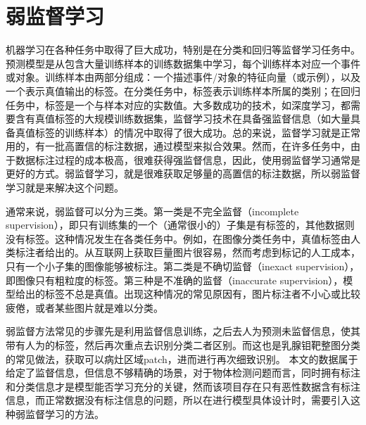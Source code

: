 \section{弱监督学习}
机器学习在各种任务中取得了巨大成功，特别是在分类和回归等监督学习任务中。预测模型是从包含大量训练样本的训练数据集中学习，每个训练样本对应一个事件或对象。训练样本由两部分组成：一个描述事件/对象的特征向量（或示例），以及一个表示真值输出的标签。在分类任务中，标签表示训练样本所属的类别；在回归任务中，标签是一个与样本对应的实数值。大多数成功的技术，如深度学习，都需要含有真值标签的大规模训练数据集，监督学习技术在具备强监督信息（如大量具备真值标签的训练样本）的情况中取得了很大成功。总的来说，监督学习就是正常用的，有一批高置信的标注数据，通过模型来拟合效果。然而，在许多任务中，由于数据标注过程的成本极高，很难获得强监督信息，因此，使用弱监督学习通常是更好的方式。弱监督学习\cite{43zhou2017brief}，就是很难获取足够量的高置信的标注数据，所以弱监督学习就是来解决这个问题。

通常来说，弱监督可以分为三类。第一类是不完全监督（incomplete supervision），即只有训练集的一个（通常很小的）子集是有标签的，其他数据则没有标签。这种情况发生在各类任务中。例如，在图像分类任务中，真值标签由人类标注者给出的。从互联网上获取巨量图片很容易，然而考虑到标记的人工成本，只有一个小子集的图像能够被标注。第二类是不确切监督（inexact supervision），即图像只有粗粒度的标签。第三种是不准确的监督（inaccurate supervision），模型给出的标签不总是真值。出现这种情况的常见原因有，图片标注者不小心或比较疲倦，或者某些图片就是难以分类。

弱监督方法常见的步骤先是利用监督信息训练，之后去人为预测未监督信息，使其带有人为的标签，然后再次重点去识别分类二者区别。而这也是乳腺钼靶整图分类的常见做法，获取可以病灶区域patch，进而进行再次细致识别。
本文的数据属于给定了监督信息，但信息不够精确的场景，对于物体检测问题而言，同时拥有标注和分类信息才是模型能否学习充分的关键，然而该项目存在只有恶性数据含有标注信息，而正常数据没有标注信息的问题，所以在进行模型具体设计时，需要引入这种弱监督学习的方法。


